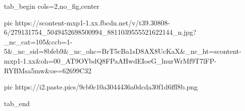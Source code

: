  
 
 
 
 

\ifcmt
  tab_begin cols=2,no_fig,center

     pic https://scontent-mxp1-1.xx.fbcdn.net/v/t39.30808-6/279131754_5049452698500994_8811039555521622144_n.jpg?_nc_cat=105&ccb=1-5&_nc_sid=8bfeb9&_nc_ohc=BrT5cBa1sD8AX8UcKaX&_nc_ht=scontent-mxp1-1.xx&oh=00_AT9OYbdQ8FPaAHwdEIoeG_lnurWrMf9T7lFP-RYBMsa5mw&oe=62699C32

		 pic https://i2.paste.pics/9cb0c10a3044436a0dcda30f1d6fff8b.png

  tab_end
\fi
